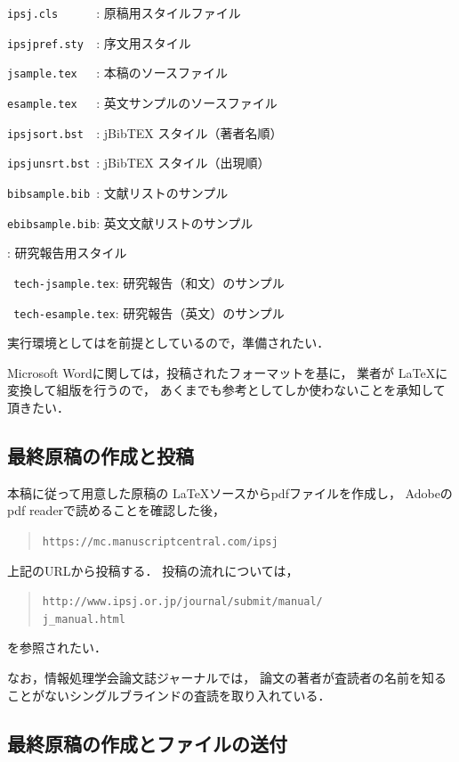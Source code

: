 \documentclass[submit]{ipsj-lualatex}
\def\|{\verb|}
\begin{document}
\begin{Enumerate}
\item \|ipsj.cls      |: 原稿用スタイルファイル
\item \|ipsjpref.sty  |: 序文用スタイル
\item \|jsample.tex   |: 本稿のソースファイル
\item \|esample.tex   |: 英文サンプルのソースファイル
\item \|ipsjsort.bst  |: jBibTEX スタイル（著者名順）
\item \|ipsjunsrt.bst |: jBibTEX スタイル（出現順）
\item \|bibsample.bib |: 文献リストのサンプル
\item \|ebibsample.bib|: 英文文献リストのサンプル
\item {}: 研究報告用スタイル
\item \| tech-jsample.tex|: 研究報告（和文）のサンプル
\item \| tech-esample.tex|: 研究報告（英文）のサンプル
\end{Enumerate}%
実行環境としては\LaTeXe を前提としているので，準備されたい．


Microsoft Wordに関しては，投稿されたフォーマットを基に，
業者が \LaTeX に変換して組版を行うので，
あくまでも参考としてしか使わないことを承知して頂きたい．



\subsection{最終原稿の作成と投稿}

本稿に従って用意した原稿の \LaTeX ソースからpdfファイルを作成し，
Adobeのpdf readerで読めることを確認した後，
\begin{quote}
\small
\|https://mc.manuscriptcentral.com/ipsj|
\end{quote}
上記のURLから投稿する．
投稿の流れについては，
\begin{quote}
\small
\|http://www.ipsj.or.jp/journal/submit/manual/|\\
\|j_manual.html|
\end{quote}
を参照されたい．



なお，情報処理学会論文誌ジャーナルでは，
論文の著者が査読者の名前を知ることがないシングルブラインドの査読を取り入れている．




\subsection{最終原稿の作成とファイルの送付}
\end{document}
